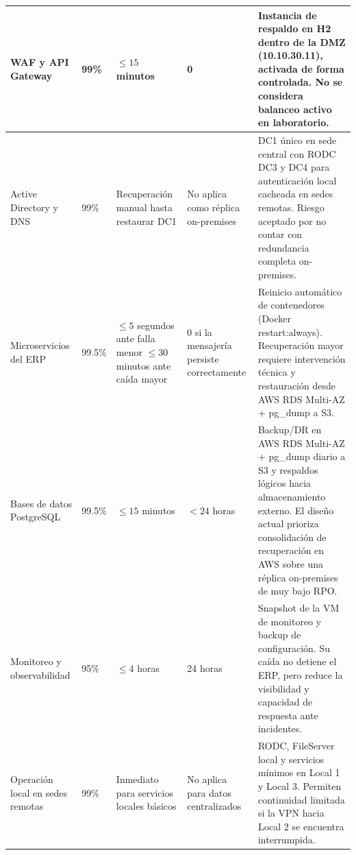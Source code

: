 \documentclass[11pt, a4paper, oneside]{report}
\begin{document}
\begin{landscape}
\begin{xltabular}{\linewidth}{@{}|L{3.7cm}|N{2.5cm}|N{2.7cm}|N{2.7cm}|X|@{}}
{\small WAF y API Gateway} &
{\small 99\%} &
{\small \(\leq 15\) minutos} &
{\small 0} &
{\small Instancia de respaldo en H2 dentro de la DMZ (10.10.30.11), activada de forma controlada. No se considera balanceo activo en laboratorio.} \\ \hline

{\small Active Directory y DNS} &
{\small 99\%} &
{\small Recuperación manual hasta restaurar DC1} &
{\small No aplica como réplica on-premises} &
{\small DC1 único en sede central con RODC DC3 y DC4 para autenticación local cacheada en sedes remotas. Riesgo aceptado por no contar con redundancia completa on-premises.} \\ \hline

{\small Microservicios del ERP} &
{\small 99.5\%} &
{\small \(\leq 5\) segundos ante falla menor\newline \(\leq 30\) minutos ante caída mayor} &
{\small 0 si la mensajería persiste correctamente} &
{\small Reinicio automático de contenedores (Docker restart:always). Recuperación mayor requiere intervención técnica y restauración desde AWS RDS Multi-AZ + pg\_dump a S3.} \\ \hline

{\small Bases de datos PostgreSQL} &
{\small 99.5\%} &
{\small \(\leq 15\) minutos} &
{\small \(< 24\) horas} &
{\small Backup/DR en AWS RDS Multi-AZ + pg\_dump diario a S3 y respaldos lógicos hacia almacenamiento externo. El diseño actual prioriza consolidación de recuperación en AWS sobre una réplica on-premises de muy bajo RPO.} \\ \hline

{\small Monitoreo y observabilidad} &
{\small 95\%} &
{\small \(\leq 4\) horas} &
{\small 24 horas} &
{\small Snapshot de la VM de monitoreo y backup de configuración. Su caída no detiene el ERP, pero reduce la visibilidad y capacidad de respuesta ante incidentes.} \\ \hline

{\small Operación local en sedes remotas} &
{\small 99\%} &
{\small Inmediato para servicios locales básicos} &
{\small No aplica para datos centralizados} &
{\small RODC, FileServer local y servicios mínimos en Local 1 y Local 3. Permiten continuidad limitada si la VPN hacia Local 2 se encuentra interrumpida.} \\ \hline

\end{xltabular}

\normalsize
\end{landscape}
\end{document}
